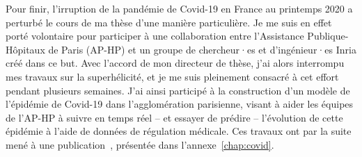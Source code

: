 Pour finir, l'irruption de la pandémie de Covid-19 en France au printemps 2020 a perturbé le cours de ma thèse d'une manière particulière.
Je me suis en effet porté volontaire pour participer à une collaboration entre l'Assistance Publique-Hôpitaux de Paris (AP-HP) et un groupe de chercheur·es et d'ingénieur·es Inria créé dans ce but.
Avec l'accord de mon directeur de thèse, j'ai alors interrompu mes travaux sur la superhélicité, et je me suis pleinement consacré à cet effort pendant plusieurs semaines.
J'ai ainsi participé à la construction d'un modèle de l'épidémie de Covid-19 dans l'agglomération parisienne, visant à aider les équipes de l'AP-HP à suivre en temps réel -- et essayer de prédire -- l'évolution de cette épidémie à l'aide de données de régulation médicale.
Ces travaux ont par la suite mené à une publication~\citep{gaubert2020}, présentée dans l'annexe~\ref{chap:covid}.

